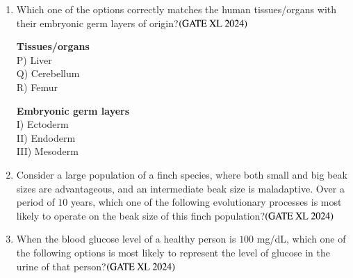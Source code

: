 \documentclass[journal]{IEEEtran}
\begin{document}
\begin{enumerate}
    \item Which one of the options correctly matches the human tissues/organs with their embryonic germ layers of origin?\hfill $\left(\text{GATE XL 2024}\right)$
    \begin{multicols}{2}
    \noindent \textbf{Tissues/organs} \\
    P) Liver \\
    Q) Cerebellum \\
    R) Femur \\

    \columnbreak

    \noindent \textbf{Embryonic germ layers} \\
    I) Ectoderm \\
    II) Endoderm \\
    III) Mesoderm \\
    \end{multicols}

    \item Consider a large population of a finch species, where both small and big beak sizes are advantageous, and an intermediate beak size is maladaptive. Over a period of $10$ years, which one of the following evolutionary processes is most likely to operate on the beak size of this finch population?\hfill $\left(\text{GATE XL 2024}\right)$
    \begin{enumerate}
    \end{enumerate}

    \item When the blood glucose level of a healthy person is $100$ mg/dL, which one of the following options is most likely to represent the level of glucose in the urine of that person?\hfill $\left(\text{GATE XL 2024}\right)$
    \begin{enumerate}
    \end{enumerate}


\end{enumerate}
\end{document}
